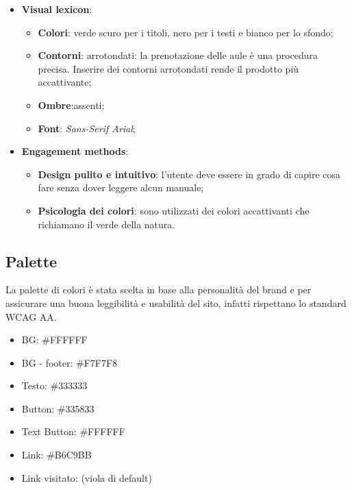 \begin{itemize}
\begin{center}
\begin{tikzpicture}
		      \end{tikzpicture}
	      \end{center}

	\item \textbf{Visual lexicon}:
	      \begin{itemize}
		      \item \textbf{Colori}: verde scuro per i titoli, nero per i testi
		            e bianco per lo sfondo;
		      \item \textbf{Contorni}: arrotondati: la prenotazione delle
		            aule è una procedura precisa. Inserire dei contorni
		            arrotondati rende il prodotto più accattivante;
		      \item \textbf{Ombre}:assenti;

		      \item \textbf{Font}: \textit{Sans-Serif Arial};
	      \end{itemize}

	\item \textbf{Engagement methods}:
	      \begin{itemize}
		      \item \textbf{Design pulito e intuitivo}: l'utente deve essere in
		            grado di capire cosa fare senza dover leggere alcun manuale;

		      \item \textbf{Psicologia dei colori}: sono utilizzati dei colori
		            accattivanti che richiamano il verde della natura.
	      \end{itemize}
\end{itemize}

\subsection{Palette}

La palette di colori è stata scelta in base alla personalità del brand e per
assicurare una buona leggibilità e usabilità del sito, infatti rispettano lo
standard WCAG AA.

\begin{itemize}
	\item BG: \#FFFFFF
	\item BG - footer: \#F7F7F8
	\item Testo: \#333333
	\item Button: \#335833
	\item Text Button: \#FFFFFF
	\item Link: \#B6C9BB
	\item Link visitato: (viola di default)
\end{itemize}

